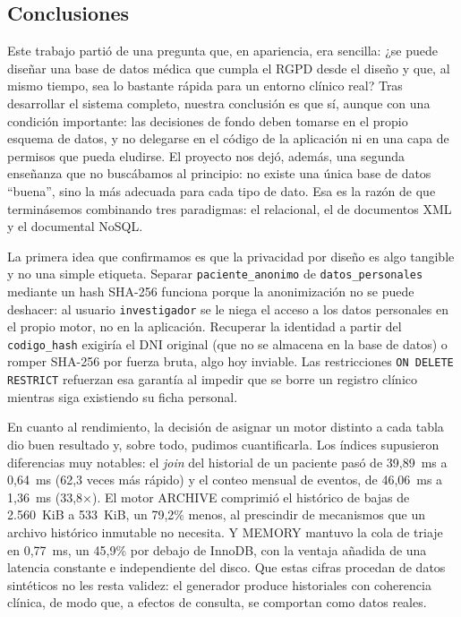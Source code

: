 \documentclass[../main.tex]{subfiles}
\begin{document}
\subsection{Conclusiones}

Este trabajo partió de una pregunta que, en apariencia, era sencilla: ¿se puede diseñar una base de datos médica que cumpla el RGPD desde el diseño y que, al mismo tiempo, sea lo bastante rápida para un entorno clínico real? Tras desarrollar el sistema completo, nuestra conclusión es que sí, aunque con una condición importante: las decisiones de fondo deben tomarse en el propio esquema de datos, y no delegarse en el código de la aplicación ni en una capa de permisos que pueda eludirse. El proyecto nos dejó, además, una segunda enseñanza que no buscábamos al principio: no existe una única base de datos \enquote{buena}, sino la más adecuada para cada tipo de dato. Esa es la razón de que terminásemos combinando tres paradigmas: el relacional, el de documentos XML y el documental NoSQL.

La primera idea que confirmamos es que la privacidad por diseño es algo tangible y no una simple etiqueta. Separar \texttt{paciente\_anonimo} de \texttt{datos\_personales} mediante un hash SHA-256 funciona porque la anonimización no se puede deshacer: al usuario \texttt{investigador} se le niega el acceso a los datos personales en el propio motor, no en la aplicación. Recuperar la identidad a partir del \texttt{codigo\_hash} exigiría el DNI original (que no se almacena en la base de datos) o romper SHA-256 por fuerza bruta, algo hoy inviable. Las restricciones \texttt{ON DELETE RESTRICT} refuerzan esa garantía al impedir que se borre un registro clínico mientras siga existiendo su ficha personal.

En cuanto al rendimiento, la decisión de asignar un motor distinto a cada tabla dio buen resultado y, sobre todo, pudimos cuantificarla. Los índices supusieron diferencias muy notables: el \textit{join} del historial de un paciente pasó de 39,89~ms a 0,64~ms (62,3 veces más rápido) y el conteo mensual de eventos, de 46,06~ms a 1,36~ms (33,8×). El motor ARCHIVE comprimió el histórico de bajas de 2.560~KiB a 533~KiB, un 79,2\% menos, al prescindir de mecanismos que un archivo histórico inmutable no necesita. Y MEMORY mantuvo la cola de triaje en 0,77~ms, un 45,9\% por debajo de InnoDB, con la ventaja añadida de una latencia constante e independiente del disco. Que estas cifras procedan de datos sintéticos no les resta validez: el generador produce historiales con coherencia clínica, de modo que, a efectos de consulta, se comportan como datos reales.
\end{document}
